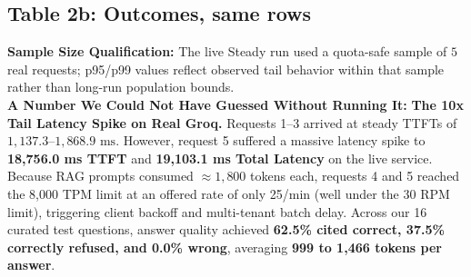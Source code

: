 \documentclass[8.5pt,a4paper]{article}
\begin{document}
\subsection*{Table 2b: Outcomes, same rows}
\vspace{0.5pt}

\vspace{1pt}
\noindent\textbf{Sample Size Qualification:} The live Steady run used a quota-safe sample of $5$ real requests; p95/p99 values reflect observed tail behavior within that sample rather than long-run population bounds.\\
\textbf{A Number We Could Not Have Guessed Without Running It:}  
\textbf{The 10x Tail Latency Spike on Real Groq.} Requests 1--3 arrived at steady TTFTs of $1,137.3\text{--}1,868.9\text{ ms}$. However, request 5 suffered a massive latency spike to \textbf{18,756.0 ms TTFT} and \textbf{19,103.1 ms Total Latency} on the live service. Because RAG prompts consumed $\approx 1,800$ tokens each, requests 4 and 5 reached the 8,000 TPM limit at an offered rate of only 25/min (well under the 30 RPM limit), triggering client backoff and multi-tenant batch delay. Across our 16 curated test questions, answer quality achieved \textbf{62.5\% cited correct, 37.5\% correctly refused, and 0.0\% wrong}, averaging \textbf{999 to 1,466 tokens per answer}.
\end{document}
